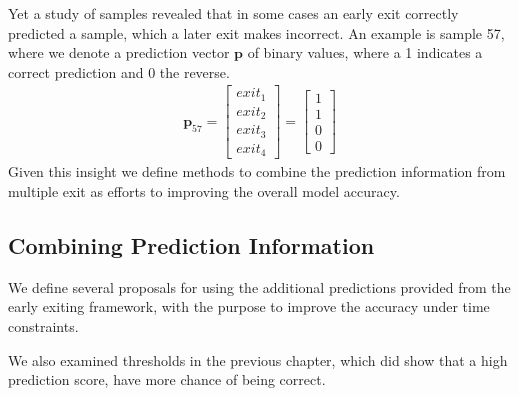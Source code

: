 Yet a study of samples revealed that in some cases an early exit correctly predicted a sample, which a later exit makes incorrect. An example is sample 57, where we denote a prediction vector $\mathbf{p}$ of binary values, where a 1 indicates a correct prediction and 0 the reverse. 
\begin{align*}
\mathbf{p}_{57}=
\begin{bmatrix}
exit_1 \\
exit_2 \\
exit_3 \\
exit_4
\end{bmatrix}
=
\begin{bmatrix}
1 \\
1 \\
0 \\
0
\end{bmatrix}
\end{align*}
Given this insight we define methods to combine the prediction information from multiple exit as efforts to improving the overall model accuracy. 

\subsection{Combining Prediction Information}


We define several proposals for using the additional predictions provided from the early exiting framework, with the purpose to improve the accuracy under time constraints. 

We also examined thresholds in the previous chapter, which did show that a high prediction score, have more chance of being correct.       

